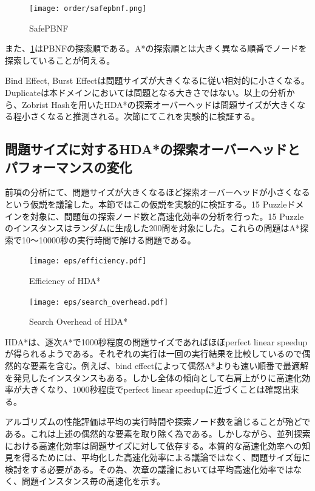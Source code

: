 \documentclass{jsarticle}
\begin{document}
\begin{figure}
	\centering
	\texttt{[image: order/safepbnf.png]}
	\label{fig:order:safepbnf}
	\caption{SafePBNF}
\end{figure}


また、\ref{fig:order:safepbnf}はPBNFの探索順である。A*の探索順とは大きく異なる順番でノードを探索していることが伺える。
\newline

Bind Effect, Burst Effectは問題サイズが大きくなるに従い相対的に小さくなる。Duplicateは本ドメインにおいては問題となる大きさではない。以上の分析から、Zobrist Hashを用いたHDA*の探索オーバーヘッドは問題サイズが大きくなる程小さくなると推測される。次節にてこれを実験的に検証する。

\subsection{問題サイズに対するHDA*の探索オーバーヘッドとパフォーマンスの変化}
\label{sec:speedup_size}

前項の分析にて、問題サイズが大きくなるほど探索オーバーヘッドが小さくなるという仮説を議論した。本節ではこの仮説を実験的に検証する。15 Puzzleドメインを対象に、問題毎の探索ノード数と高速化効率の分析を行った。15 Puzzleのインスタンスはランダムに生成した200問を対象にした。これらの問題はA*探索で10～10000秒の実行時間で解ける問題である。


\begin{figure}
	\centering
	\texttt{[image: eps/efficiency.pdf]}	
	\label{fig:david_speedup}
	\caption{Efficiency of HDA*}
\end{figure}
\begin{figure}
	\centering
	\texttt{[image: eps/search\_overhead.pdf]}	
	\label{fig:david_so}
	\caption{Search Overhead of HDA*}
\end{figure}

HDA*は、逐次A*で1000秒程度の問題サイズであればほぼperfect linear speedupが得られるようである。それぞれの実行は一回の実行結果を比較しているので偶然的な要素を含む。例えば、bind effectによって偶然A*よりも速い順番で最適解を発見したインスタンスもある。しかし全体の傾向として右肩上がりに高速化効率が大きくなり、1000秒程度でperfect linear speedupに近づくことは確認出来る。

アルゴリズムの性能評価は平均の実行時間や探索ノード数を論じることが殆どである。これは上述の偶然的な要素を取り除く為である。しかしながら、並列探索における高速化効率は問題サイズに対して依存する。本質的な高速化効率への知見を得るためには、平均化した高速化効率による議論ではなく、問題サイズ毎に検討をする必要がある。その為、次章の議論においては平均高速化効率ではなく、問題インスタンス毎の高速化を示す。
\end{document}
